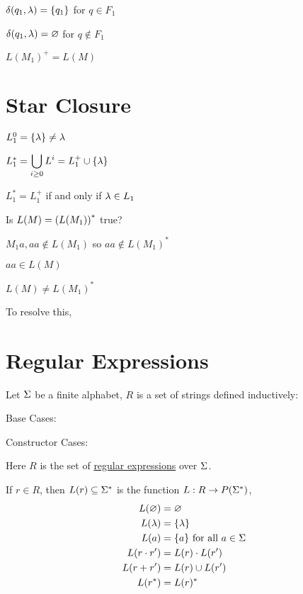 \documentclass[11pt, cyan, night, 0.5in]{LatexTemplate/hw}
\begin{document}
$\delta(q_1,\lambda)=\{q_1\}$ for $q\in F_1$

$\delta(q_1,\lambda)=\varnothing$ for $q\notin F_1$

$L(M_1)^+=L(M)$

\section{Star Closure}

$L_1^0 = \{\lambda\}\neq \lambda$

$L_1^*=\displaystyle\bigcup_{i\ge0}L^i=L_1^+\cup\{\lambda\}$

$L_1^*=L_1^+$ if and only if $\lambda\in L_1$


Is $L(M)=\left(L(M_1)\right)^*$ true?



$M_1 a,aa\notin L(M_1)$ so $aa\notin L(M_1)^*$

$aa\in L(M)$

$L(M)\neq L(M_1)^*$

To resolve this, 

\section{Regular Expressions}

Let $\Sigma$ be a finite alphabet, $R$ is a set of strings defined inductively:

Base Cases:

Constructor Cases:

Here $R$ is the set of \underline{regular expressions} over $\Sigma$.

If $r\in R$, then $L(r)\subseteq \Sigma^*$ is the function $L: R\to P(\Sigma^*)$,
\begin{align*}
    L(\varnothing)&=\varnothing\\
    L(\lambda)&=\{\lambda\}\\
    L(a)&=\{a\}\text{ for all }a\in\Sigma\\
    L(r\cdot r')&=L(r)\cdot L(r')\\
    L(r+r')&=L(r)\cup L(r')\\
    L(r^*)&=L(r)^*
\end{align*}

\end{document}
